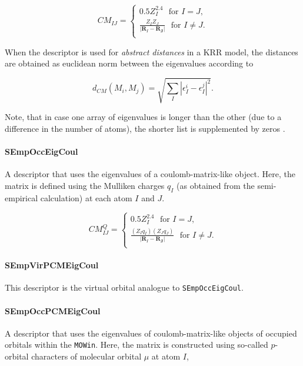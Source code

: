 \documentclass[12pt]{achemso}
\begin{document}
\begin{equation}
    CM_{IJ} =\begin{cases}
    0.5 Z_I^{2.4} \,\,\,\, \mathrm{for}\,\, I = J,\\[0.5em]
    \frac{Z_I Z_J}{|\mathbf{R}_I - \mathbf{R_J}|} \,\,\,\, \mathrm{for}\,\, I \neq J.\\
    \end{cases}
\end{equation}

When the descriptor is used for \textit{abstract distances} in a KRR model, the distances are obtained as euclidean norm between the eigenvalues according to

\begin{equation}
    d_{CM}(M_i, M_j) = \sqrt{\sum\limits_I |\epsilon_I^i - \epsilon_I^j|^2}.
\end{equation}

Note, that in case one array of eigenvalues is longer than the other (due to a difference in the number of atoms), the shorter list is supplemented by zeros \cite{Rupp2012}.


\paragraph{SEmpOccEigCoul} 
A descriptor that uses the eigenvalues of a coulomb-matrix-like object. Here, the matrix is defined using the Mulliken charges $q_I$ (as obtained from the semi-empirical calculation) at each atom $I$ and $J$.

\begin{equation}
    CM_{IJ}^Q =\begin{cases}
    0.5 Z_I^{2.4} \,\,\,\, \mathrm{for}\,\, I = J,\\[0.5em]
    \frac{(Z_I q_I) (Z_J q_J)}{|\mathbf{R}_I - \mathbf{R_J}|} \,\,\,\, \mathrm{for}\,\, I \neq J.\\
    \end{cases}
\end{equation}


\paragraph{SEmpVirPCMEigCoul}
This descriptor is the virtual orbital analogue to \verb+SEmpOccEigCoul+.

\paragraph{SEmpOccPCMEigCoul}
A descriptor that uses the eigenvalues of coulomb-matrix-like objects of occupied orbitals within the \verb+MOWin+. Here, the matrix is constructed using so-called $p$-orbital characters of molecular orbital $\mu$ at atom $I$, 
\end{document}
